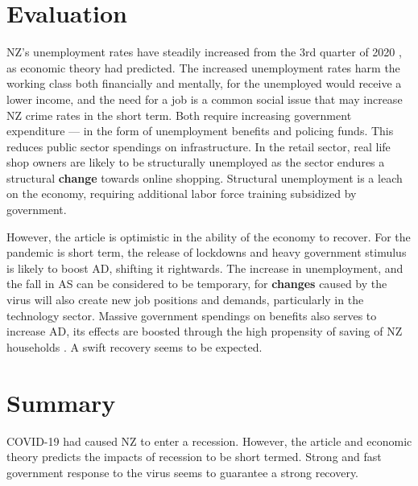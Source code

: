 \documentclass[a4paper,12pt]{article}
\begin{document}
\section*{Evaluation}

NZ's unemployment rates have steadily increased from the 3rd quarter of 2020 \parencite{unemploy}, as economic theory had predicted. The increased unemployment rates harm the working class both financially and mentally, for the unemployed would receive a lower income, and the need for a job is a common social issue that may increase NZ crime rates in the short term. Both require increasing government expenditure --- in the form of unemployment benefits and policing funds. This reduces public sector spendings on infrastructure. In the retail sector, real life shop owners are likely to be structurally unemployed as the sector endures a structural \textbf{change} towards online shopping. Structural unemployment is a leach on the economy, requiring additional labor force training subsidized by government.

However, the article is optimistic in the ability of the economy to recover. For the pandemic is short term, the release of lockdowns and heavy government stimulus is likely to boost AD, shifting it rightwards. The increase in unemployment, and the fall in AS can be considered to be temporary, for \textbf{changes} caused by the virus will also create new job positions and demands, particularly in the technology sector. Massive government spendings on benefits also serves to increase AD, its effects are boosted through the high propensity of saving of NZ households \parencite{spend}. A swift recovery seems to be expected.


\section*{Summary}

COVID-19 had caused NZ to enter a recession. However, the article and economic theory predicts the impacts of recession to be short termed. Strong and fast government response to the virus seems to guarantee a strong recovery.

\newpage
\nocite{*}
\printbibliography
\end{document}
